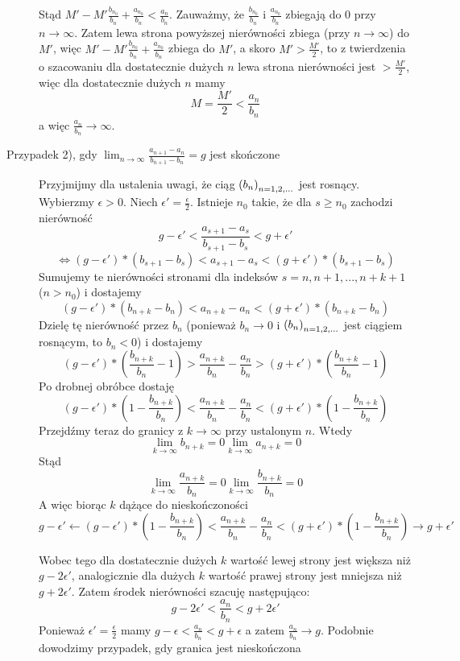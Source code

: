 \documentclass[9pt]{article}
\begin{document}
\begin{description}
        Stąd $M' - M'\frac{b_{n_0}}{b_n} + \frac{a_{n_0}}{b_n} < \frac{a_n}{b_n}$. Zauważmy, że
        $\frac{b_{n_0}}{b_n}$ i $\frac{a_{n_0}}{b_n}$ zbiegają do $0$ przy $n \to \infty$. Zatem
        lewa strona powyższej nierówności zbiega (przy $n \to \infty$) do $M'$, więc $M' -
        M'\frac{b_{n_0}}{b_n} + \frac{a_{n_0}}{b_n}$ zbiega do $M'$, a skoro $M' > \frac{M'}{2}$, to
        z twierdzenia o szacowaniu dla dostatecznie dużych $n$ lewa strona nierówności jest $ >
        \frac{M'}{2}$, więc dla dostatecznie dużych $n$ mamy
        \[
            M = \frac{M'}{2} < \frac{a_n}{b_n}
        \]
        a więc $\frac{a_n}{b_n} \to \infty$.
    \item[Przypadek 2), gdy $\lim_{n \to \infty} {\frac{a_{n+1}-a_n}{b_{n+1}-b_n}} = g$ jest
        skończone] Przyjmijmy dla ustalenia uwagi, że ciąg $\left(b_n\right)_{n = 1,2,...}$ jest rosnący. Wybierzmy
        $\epsilon > 0$. Niech $\epsilon' = \frac{\epsilon}{2}$. Istnieje $n_0$ takie, że dla $s \ge n_0$ zachodzi
        nierówność
        \[
            g - \epsilon' < \frac{a_{s+1} - a_s}{b_{s+1}-b_s} < g + \epsilon'
        \]
        \[
            \iff (g - \epsilon')*(b_{s+1}-b_s) < a_{s+1} - a_s < (g + \epsilon')*(b_{s+1}-b_s)
        \]
        Sumujemy te nierówności stronami dla indeksów $s = n, n+1, ..., n+k+1$ ($n > n_0$) i
        dostajemy
        \[
            (g - \epsilon')*(b_{n+k}-b_n) < a_{n+k} - a_n < (g + \epsilon')*(b_{n+k}-b_n)
        \]
        Dzielę tę nierówność przez $b_n$ (ponieważ $b_n \to 0$ i $\left(b_n\right)_{n = 1,2,...}$ jest ciągiem rosnącym,
        to $b_n < 0$) i dostajemy
        \[
            (g - \epsilon')*(\frac{b_{n+k}}{b_n}-1) > \frac{a_{n+k}}{b_n} - \frac{a_n}{b_n} > (g +
            \epsilon')*(\frac{b_{n+k}}{b_n}-1)
        \]
        Po drobnej obróbce dostaję
        \[
            (g - \epsilon')*(1 - \frac{b_{n+k}}{b_n}) < \frac{a_{n+k}}{b_n} - \frac{a_n}{b_n} < (g +
            \epsilon')*(1 - \frac{b_{n+k}}{b_n})
        \]
        Przejdźmy teraz do granicy z $k \to \infty$ przy ustalonym $n$. Wtedy
        \[
            \lim_{k \to \infty} b_{n+k} = 0
            \lim_{k \to \infty} a_{n+k} = 0
        \]
        Stąd
        \[
            \lim_{k \to \infty} \frac{a_{n+k}}{b_n} = 0
            \lim_{k \to \infty} \frac{b_{n+k}}{b_n} = 0
        \]
        A więc biorąc $k$ dążące do nieskończoności
        \[
            g - \epsilon' \leftarrow (g - \epsilon')*(1 - \frac{b_{n+k}}{b_n}) < \frac{a_{n+k}}{b_n} - \frac{a_n}{b_n} < (g +
            \epsilon')*(1 - \frac{b_{n+k}}{b_n}) \to g + \epsilon'
        \]

        Wobec tego dla dostatecznie dużych $k$ wartość lewej strony jest większa niż $g -
        2\epsilon'$, analogicznie dla dużych $k$ wartość prawej strony jest mniejsza niż $g +
        2\epsilon'$. Zatem środek nierówności szacuję następująco:
        \[
            g - 2\epsilon' < \frac{a_n}{b_n} < g+2\epsilon'
        \]
        Ponieważ $\epsilon' = \frac{\epsilon}{2}$ mamy $g - \epsilon < \frac{a_n}{b_n} < g+\epsilon$
        a zatem $\frac{a_n}{b_n} \to g$. Podobnie dowodzimy przypadek, gdy granica jest nieskończona
\end{description}
\end{document}
